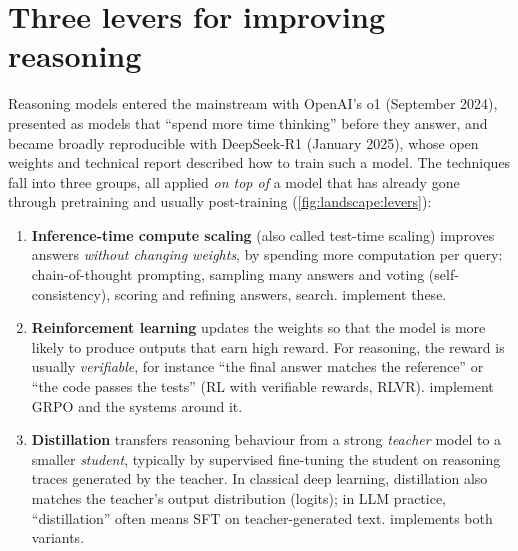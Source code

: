 \section{Three levers for improving reasoning}\label{sec:landscape:levers}

Reasoning models entered the mainstream with OpenAI's o1 (September 2024), presented as models that
``spend more time thinking'' before they answer, and became broadly reproducible with DeepSeek-R1
(January 2025), whose open weights and technical report described how to train such a model. The
techniques fall into three groups, all applied \emph{on top of} a model that has already gone through
pretraining and usually post-training (\cref{fig:landscape:levers}):

\begin{enumerate}
\item \textbf{Inference-time compute scaling} (also called test-time scaling) improves answers
  \emph{without changing weights}, by spending more computation per query: chain-of-thought prompting,
  sampling many answers and voting (self-consistency), scoring and refining answers, search.
   implement these.
\item \textbf{Reinforcement learning} updates the weights so that the model is more likely to produce
  outputs that earn high reward. For reasoning, the reward is usually \emph{verifiable}, for instance
  ``the final answer matches the reference'' or ``the code passes the tests'' (RL with verifiable
  rewards, RLVR).  implement GRPO and the systems around it.
\item \textbf{Distillation} transfers reasoning behaviour from a strong \emph{teacher} model to a smaller
  \emph{student}, typically by supervised fine-tuning the student on reasoning traces generated by the
  teacher. In classical deep learning, distillation also matches the teacher's output distribution
  (logits); in LLM practice, ``distillation'' often means SFT on teacher-generated text.
   implements both variants.
\end{enumerate}

